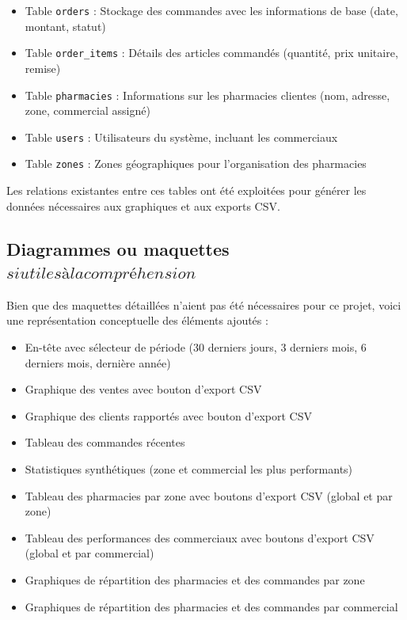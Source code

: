 \documentclass[a4paper,12pt]{report}
\begin{document}
  \begin{itemize}
    \item Table \texttt{orders} : Stockage des commandes avec les informations de base (date, montant, statut)
    \item Table \texttt{order\_items} : Détails des articles commandés (quantité, prix unitaire, remise)
    \item Table \texttt{pharmacies} : Informations sur les pharmacies clientes (nom, adresse, zone, commercial assigné)
    \item Table \texttt{users} : Utilisateurs du système, incluant les commerciaux
    \item Table \texttt{zones} : Zones géographiques pour l'organisation des pharmacies
  \end{itemize}
  
  Les relations existantes entre ces tables ont été exploitées pour générer les données nécessaires aux graphiques et aux exports CSV.

  \subsection{Diagrammes ou maquettes \(si utiles à la compréhension\)}
  Bien que des maquettes détaillées n'aient pas été nécessaires pour ce projet, voici une représentation conceptuelle des éléments ajoutés :
  
  \begin{tcolorbox}[colback=lightgray!10!white, colframe=naturacorpgreen, title=Structure du tableau de bord commercial]
  \begin{itemize}
    \item En-tête avec sélecteur de période (30 derniers jours, 3 derniers mois, 6 derniers mois, dernière année)
    \item Graphique des ventes avec bouton d'export CSV
    \item Graphique des clients rapportés avec bouton d'export CSV
    \item Tableau des commandes récentes
  \end{itemize}
  \end{tcolorbox}
  
  \begin{tcolorbox}[colback=lightgray!10!white, colframe=naturacorpgreen, title=Structure de la page Rapports administrateur]
  \begin{itemize}
    \item Statistiques synthétiques (zone et commercial les plus performants)
    \item Tableau des pharmacies par zone avec boutons d'export CSV (global et par zone)
    \item Tableau des performances des commerciaux avec boutons d'export CSV (global et par commercial)
    \item Graphiques de répartition des pharmacies et des commandes par zone
    \item Graphiques de répartition des pharmacies et des commandes par commercial
  \end{itemize}
  \end{tcolorbox}
\end{document}
